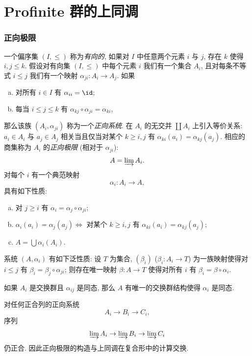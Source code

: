 \section{Profinite 群的上同调}\label{sec:II.4}

\subsubsection*{正向极限}

一个偏序集 $(I,\le)$ 称为\emph{有向的}, 如果对 $I$ 中任意两个元素 $i$ 与 $j$, 存在 $k$ 使得 $i,j\le k$. 假设对有向集 $(I,\le)$ 中每个元素 $i$ 我们有一个集合 $A_i$, 且对每条不等式 $i\le j$ 我们有一个映射 $\alpha_{ji}\colon A_i\to A_j$. 如果
\begin{enumerate}[(a)]
\item 对所有 $i\in I$ 有 $\alpha_{ii}=\id$;
\item 每当 $i\le j\le k$ 有 $\alpha_{kj}\circ\alpha_{ji}=\alpha_{ki}$,
\end{enumerate}
那么该族 $(A_i,\alpha_{ji})$ 称为一个\emph{正向系统}. 在 $A_i$ 的无交并 $\coprod A_i$ 上引入等价关系: $a_i\in A_i$ 与 $a_j\in A_j$ 相关当且仅当对某个 $k\ge i,j$ 有 $\alpha_{ki}(a_i)=\alpha_{kj}(a_j)$. 相应的商集称为 $A_i$ 的\emph{正向极限} (相对于 $\alpha_{ji}$):
\[
 A=\varinjlim A_i.
\]
对每个 $i$ 有一个典范映射
\[
 \alpha_i\colon A_i\to A,
\]
具有如下性质:
\begin{enumerate}[(a)]
\item 对 $j\ge i$ 有 $\alpha_i=\alpha_j\circ\alpha_{ji}$;
\item $\alpha_i(a_i)=\alpha_j(a_j)\iff$ 对某个 $k\ge i,j$ 有 $\alpha_{ki}(a_i)=\alpha_{kj}(a_j)$;
\item $A=\bigcup \alpha_i(A_i)$.
\end{enumerate}
系统 $(A,\alpha_i)$ 有如下泛性质: 设 $T$ 为集合, $(\beta_i)$ ($\beta_i\colon A_i\to T$) 为一族映射使得对 $i\le j$ 有 $\beta_i=\beta_j\circ\alpha_{ji}$; 则存在唯一映射 $\beta\colon A\to T$ 使得对所有 $i$ 有 $\beta_i=\beta\circ\alpha_i$.

如果 $A_i$ 是交换群且 $\alpha_{ij}$ 是同态, 那么 $A$ 有唯一的交换群结构使得 $\alpha_i$ 是同态.

\begin{lemma}\label{lem:ii.4.1}
对任何正合列的正向系统
\[
 A_i\to B_i\to C_i,
\]
序列
\[
 \varinjlim A_i\to \varinjlim B_i\to \varinjlim C_i
\]
仍正合. 因此正向极限的构造与上同调在复合形中的计算交换.
\end{lemma}

